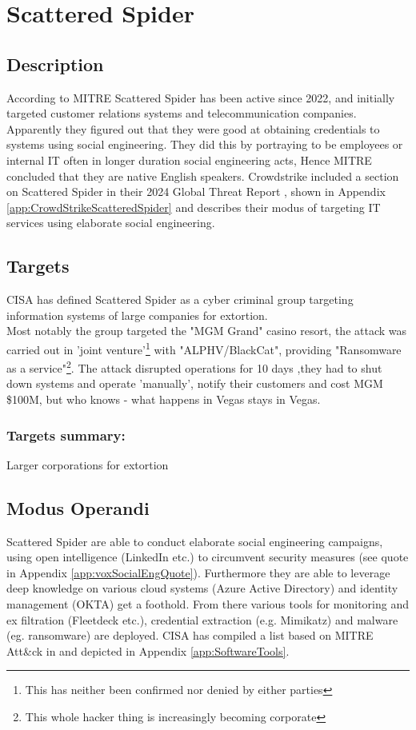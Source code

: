 \documentclass[
	letterpaper, %
	10pt, %
	unnumberedsections, %
	twoside, %
]{APAAssignment}
\begin{document}
\section{Scattered Spider}
\subsection{Description}
According to MITRE\cite{MITRE_ScatteredSpider} Scattered Spider has been active since 2022, and initially targeted customer relations systems and telecommunication companies. Apparently they figured out that they were good at obtaining credentials to systems using social engineering. They did this by portraying to be employees or internal IT often in longer duration social engineering acts, Hence MITRE concluded that they are native English speakers. Crowdstrike included a section on Scattered Spider in their 2024 Global Threat Report \cite{CrowdStrikeGTR2024}, shown in Appendix \ref{app:CrowdStrikeScatteredSpider} and describes their modus of targeting IT services using elaborate social engineering.

\subsection{Targets}
CISA\cite{CISA_ScattetedSpider} has defined Scattered Spider as a cyber criminal group targeting information systems of large companies for extortion. \\
Most notably the group targeted the "MGM Grand" casino resort, the attack was carried out in 'joint venture'\footnote{This has neither been confirmed nor denied by either parties} with "ALPHV/BlackCat"\cite{UHonMGM-ALPHV}\cite{VOXonMGM-Hack}, providing "Ransomware as a service"\footnote{This whole hacker thing is increasingly becoming corporate}. The attack disrupted operations for 10 days ,they had to shut down systems and operate 'manually', notify their customers and cost MGM \$100M\cite{UHonMGM-ALPHV}, but who knows - what happens in Vegas stays in Vegas.

\subsubsection{Targets summary:} Larger corporations for extortion

\subsection{Modus Operandi}
Scattered Spider are able to conduct elaborate social engineering campaigns, using open intelligence (LinkedIn etc.) to circumvent security measures (see quote in Appendix \ref{app:voxSocialEngQuote}). Furthermore they are able to leverage deep knowledge on various cloud systems (Azure Active Directory) and identity management (OKTA) get a foothold. From there various tools for monitoring and ex filtration (Fleetdeck etc.), credential extraction (e.g. Mimikatz) and malware (eg. ransomware) are deployed. CISA has compiled a list based on MITRE Att\&ck in \cite{CISA_ScattetedSpider} and depicted in Appendix \ref{app:SoftwareTools}. \\
\end{document}
